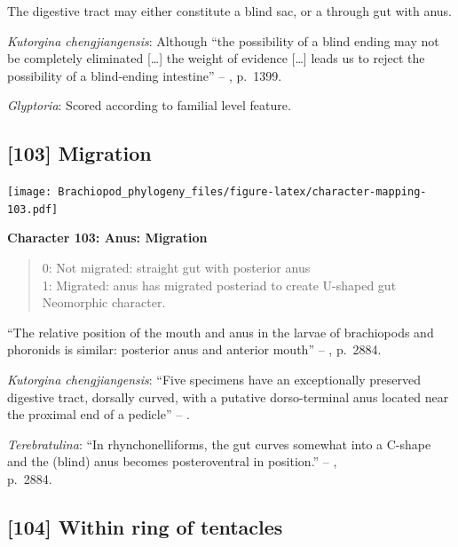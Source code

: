 \documentclass[]{book}
\theoremstyle{definition}
\theoremstyle{definition}
\theoremstyle{definition}
\theoremstyle{remark}
\begin{document}
The digestive tract may either constitute a blind sac, or a through gut
with anus.

\emph{Kutorgina chengjiangensis}: Although ``the possibility of a blind
ending may not be completely eliminated {[}\ldots{}{]} the weight of
evidence {[}\ldots{}{]} leads us to reject the possibility of a
blind-ending intestine'' --
\citet{Zhang2007Rhynchonelliformeanbrachiopods}, p.~1399.

\emph{Glyptoria}: Scored according to familial level feature.

\hypertarget{migration}{%
\subsection*{{[}103{]} Migration}\label{migration}}

\texttt{[image: Brachiopod\_phylogeny\_files/figure-latex/character-mapping-103.pdf]}

\textbf{Character 103: Anus: Migration}

\begin{quote}
0: Not migrated: straight gut with posterior anus\\
1: Migrated: anus has migrated posteriad to create U-shaped gut\\
Neomorphic character.
\end{quote}

``The relative position of the mouth and anus in the larvae of
brachiopods and phoronids is similar: posterior anus and anterior
mouth'' -- \citet{Williams2007PartH}, p.~2884.

\emph{Kutorgina chengjiangensis}: ``Five specimens have an exceptionally
preserved digestive tract, dorsally curved, with a putative
dorso-terminal anus located near the proximal end of a pedicle'' --
\citet{Zhang2007Rhynchonelliformeanbrachiopods}.

\emph{Terebratulina}: ``In rhynchonelliforms, the gut curves somewhat
into a C-shape and the (blind) anus becomes posteroventral in
position.'' -- \citet{Williams2007PartH},\\
p.~2884.

\hypertarget{within-ring-of-tentacles}{%
\subsection*{{[}104{]} Within ring of
tentacles}\label{within-ring-of-tentacles}}
\end{document}
